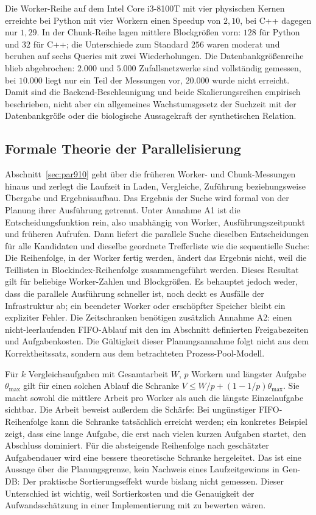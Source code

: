 \documentclass[a4paper,12pt, twoside]{report}
\theoremstyle{definition}
\begin{document}
Die Worker-Reihe auf dem Intel Core i3-8100T mit vier physischen Kernen erreichte bei Python mit vier Workern einen Speedup von $2{,}10$, bei C++ dagegen nur $1{,}29$. In der Chunk-Reihe lagen mittlere Blockgrößen vorn: $128$ für Python und $32$ für C++; die Unterschiede zum Standard $256$ waren moderat und beruhen auf sechs Queries mit zwei Wiederholungen. Die Datenbankgrößenreihe blieb abgebrochen: $2.000$ und $5.000$ Zufallsnetzwerke sind vollständig gemessen, bei $10.000$ liegt nur ein Teil der Messungen vor, $20.000$ wurde nicht erreicht. Damit sind die Backend-Beschleunigung und beide Skalierungsreihen empirisch beschrieben, nicht aber ein allgemeines Wachstumsgesetz der Suchzeit mit der Datenbankgröße oder die biologische Aussagekraft der synthetischen Relation.

\subsection{Formale Theorie der Parallelisierung}
\label{sec:zus_paralleltheorie}

Abschnitt~\ref{sec:par910} geht über die früheren Worker- und Chunk-Messungen hinaus und zerlegt die Laufzeit in Laden, Vergleiche, Zuführung beziehungsweise Übergabe und Ergebnisaufbau. Das Ergebnis der Suche wird formal von der Planung ihrer Ausführung getrennt. Unter Annahme A1 ist die Entscheidungsfunktion rein, also unabhängig von Worker, Ausführungszeitpunkt und früheren Aufrufen. Dann liefert die parallele Suche dieselben Entscheidungen für alle Kandidaten und dieselbe geordnete Trefferliste wie die sequentielle Suche: Die Reihenfolge, in der Worker fertig werden, ändert das Ergebnis nicht, weil die Teillisten in Blockindex-Reihenfolge zusammengeführt werden. Dieses Resultat gilt für beliebige Worker-Zahlen und Blockgrößen. Es behauptet jedoch weder, dass die parallele Ausführung schneller ist, noch deckt es Ausfälle der Infrastruktur ab; ein beendeter Worker oder erschöpfter Speicher bleibt ein expliziter Fehler. Die Zeitschranken benötigen zusätzlich Annahme A2: einen nicht-leerlaufenden FIFO-Ablauf mit den im Abschnitt definierten Freigabezeiten und Aufgabenkosten. Die Gültigkeit dieser Planungsannahme folgt nicht aus dem Korrektheitssatz, sondern aus dem betrachteten Prozess-Pool-Modell.

Für $k$ Vergleichsaufgaben mit Gesamtarbeit $W$, $p$ Workern und längster Aufgabe $\theta_{\max}$ gilt für einen solchen Ablauf die Schranke $V\le W/p+(1-1/p)\theta_{\max}$. Sie macht sowohl die mittlere Arbeit pro Worker als auch die längste Einzelaufgabe sichtbar. Die Arbeit beweist außerdem die Schärfe: Bei ungünstiger FIFO-Reihenfolge kann die Schranke tatsächlich erreicht werden; ein konkretes Beispiel zeigt, dass eine lange Aufgabe, die erst nach vielen kurzen Aufgaben startet, den Abschluss dominiert. Für die absteigende Reihenfolge nach geschätzter Aufgabendauer wird eine bessere theoretische Schranke hergeleitet. Das ist eine Aussage über die Planungsgrenze, kein Nachweis eines Laufzeitgewinns in Gen-DB: Der praktische Sortierungseffekt wurde bislang nicht gemessen. Dieser Unterschied ist wichtig, weil Sortierkosten und die Genauigkeit der Aufwandsschätzung in einer Implementierung mit zu bewerten wären.
\end{document}
